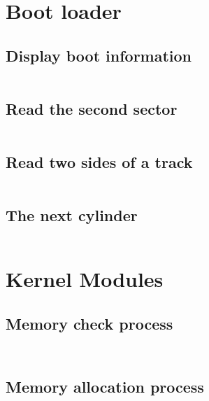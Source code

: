 \documentclass{swfcthesis}
\begin{document}
\section{Boot loader}

\subsection{Display boot information}
\label{sec:dis-boo-inf}

\inputminted[firstline=55, lastline=65,
linenos=true]{nasm}{../../src/kernel/ipl10.asm}

\subsection{Read the second sector}
\label{sec:rea-sec-sec}
  
\inputminted[firstline=87,lastline=106,linenos=true]{nasm}{../../src/kernel/ipl10.asm}

\subsection{Read two sides of a track}
\label{sec:rea-two-sid}

\inputminted[firstline=108,lastline=132,linenos=true]{nasm}{../../src/kernel/ipl10.asm}

\subsection{The next cylinder}
\label{sec:the-nex-cyl}
\inputminted[firstline=134,lastline=137,linenos=true]{nasm}{../../src/kernel/ipl10.asm}


\section{Kernel Modules}
\label{sec:kernel-modules}
\subsection{Memory check process}
\label{sec:memory-check-process}

\inputminted[firstline=7, lastline=42, linenos=true]{c}{../../src/kernel/memory.c}
\inputminted[firstline=220, lastline=254,
linenos=true]{nasm}{../../src/kernel/naskfunc.asm}

\subsection{Memory allocation process}
\label{sec:memory-alloc-proc}
\inputminted[tabsize=2, firstline=64, lastline=85,
linenos=true]{c}{../../src/kernel/memory.c}
\end{document}
